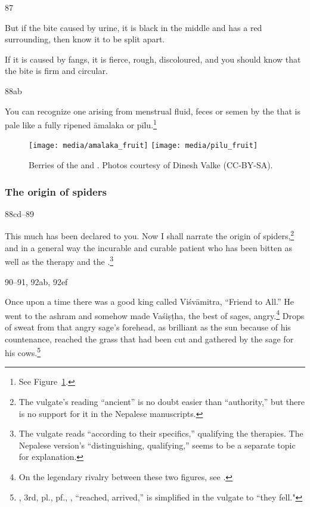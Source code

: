 \begin{translation}
\item[87]

But if the bite caused by urine, it is black in the middle and has a red 
surrounding, then know it to be split apart. 

If it is caused by fangs, it is fierce, rough, discoloured, and 
you  should know that the bite is firm and circular.

\item[88ab]

You can recognize one arising from menstrual fluid, feces or semen by
the  that is pale like a fully ripened \gls{āmalaka} or
\gls{pīlu}.\footnote{See Figure~\ref{fig:pilufruit}.}
%
\begin{figure}
    \centering
    \texttt{[image: media/amalaka\_fruit]}
    \hfill
    \texttt{[image: media/pilu\_fruit]}
        \caption{Berries of the  and . Photos 
        courtesy of Dinesh Valke (CC-BY-SA).}
    \label{fig:pilufruit}
\end{figure}


\subsubsection{The origin of spiders}
\item[88cd--89]

This much has been declared to you.  Now I shall narrate the
 origin of spiders,\footnote{The vulgate's reading
     “ancient” is no doubt easier than 
    “authority,” but there is no support for it in the Nepalese
    manuscripts.} and in a general way the incurable and curable patient
    who has been bitten as well as the therapy and the .\footnote{The vulgate reads  “according
        to their specifics,” qualifying the therapies.  The Nepalese version's
         “distinguishing, qualifying,” seems to be a
        separate topic for explanation.}
 
 \bigskip
    
\item[90--91, 92ab, 92ef]        

Once upon a time there was a good king called Viśvāmitra, “Friend to
All.”  He went to the ashram and somehow made Vaśiṣṭha, the best of
sages, angry.\footnote{On the legendary rivalry between these two
    figures, see \cite[Introduction, et passim]{sath-2015}.} Drops of
    sweat from that angry sage's forehead, as brilliant as the sun because
    of his countenance, reached the grass that had been cut
   and gathered by the sage for his
    cows.\footnote{, 3rd, pl., pf., \root {},
        “reached, arrived,” is simplified in the vulgate to  “they
        fell."
    
}
\end{translation}
